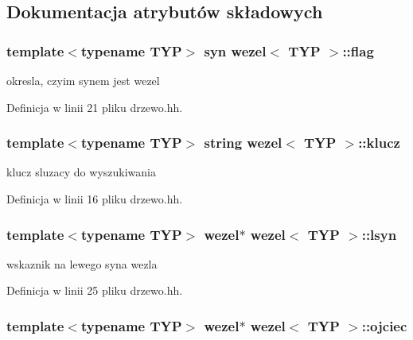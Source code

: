 \subsection{Dokumentacja atrybutów składowych}
\hypertarget{classwezel_afdf37f0bdec8aad5a7bdb490ac12f6f1}{
\subsubsection[{flag}]{\setlength{\rightskip}{0pt plus 5cm}template$<$typename T\-Y\-P$>$ {\bf syn} {\bf wezel}$<$ T\-Y\-P $>$\-::{\bf flag}}}\label{classwezel_afdf37f0bdec8aad5a7bdb490ac12f6f1}


okresla, czyim synem jest wezel 



Definicja w linii 21 pliku drzewo.\-hh.

\hypertarget{classwezel_ada78704962c0e466156d3175b6cf9228}{
\subsubsection[{klucz}]{\setlength{\rightskip}{0pt plus 5cm}template$<$typename T\-Y\-P$>$ string {\bf wezel}$<$ T\-Y\-P $>$\-::klucz\hspace{0.3cm}{\ttfamily [private]}}}\label{classwezel_ada78704962c0e466156d3175b6cf9228}


klucz sluzacy do wyszukiwania 



Definicja w linii 16 pliku drzewo.\-hh.

\hypertarget{classwezel_aea9a623088a96fc878c52ac35625f961}{
\subsubsection[{lsyn}]{\setlength{\rightskip}{0pt plus 5cm}template$<$typename T\-Y\-P$>$ {\bf wezel}$\ast$ {\bf wezel}$<$ T\-Y\-P $>$\-::lsyn}}\label{classwezel_aea9a623088a96fc878c52ac35625f961}


wskaznik na lewego syna wezla 



Definicja w linii 25 pliku drzewo.\-hh.

\hypertarget{classwezel_a85d0d08cd058b7ba0546c31e7cb464b0}{
\subsubsection[{ojciec}]{\setlength{\rightskip}{0pt plus 5cm}template$<$typename T\-Y\-P$>$ {\bf wezel}$\ast$ {\bf wezel}$<$ T\-Y\-P $>$\-::ojciec}}\label{classwezel_a85d0d08cd058b7ba0546c31e7cb464b0}


